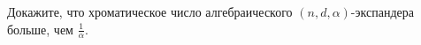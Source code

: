 Докажите, что хроматическое число алгебраического $(n, d, \alpha)$-экспандера больше, чем
$\frac{1}{\alpha}$.
